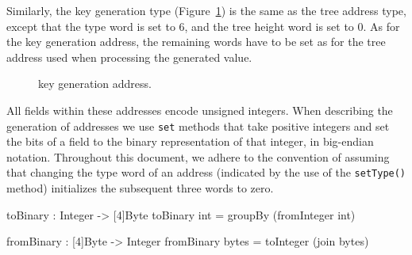 Similarly, the \fors key generation type (Figure~\ref{fig:adrs:forskg}) is the same as the \fors tree address type, except that the type word is set to 6, and the tree height word is set to 0. As for the \wotsp key generation address, the remaining words have to be set as for the \fors tree address used when processing the generated value.
\begin{figure}[h]
  \centering
  \caption{\fors key generation address.}
  \label{fig:adrs:forskg}
\end{figure}


   All fields within these addresses encode unsigned integers.  When
   describing the generation of addresses we use \texttt{set} methods that
   take positive integers and set the bits of a field to the binary
   representation of that integer, in big-endian
   notation. Throughout this document, we adhere to the convention
   of assuming that changing the type word of an address
   (indicated by the use of the \texttt{setType()} method)
   initializes the subsequent three words to zero.

\begin{code}
  toBinary : Integer -> [4]Byte
  toBinary int = groupBy (fromInteger int)

  fromBinary : [4]Byte -> Integer
  fromBinary bytes = toInteger (join bytes)
\end{code}


